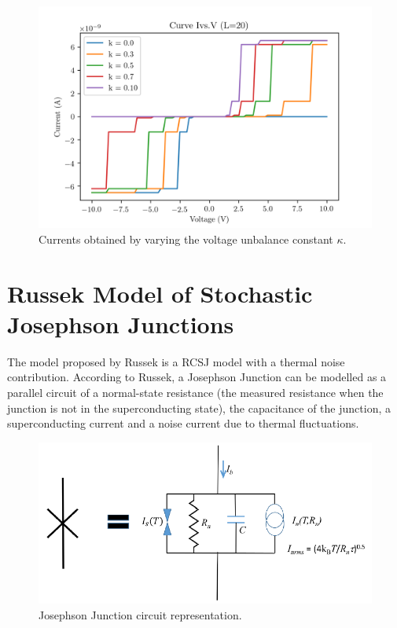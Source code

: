 \documentclass[12pt]{article}
\begin{document}
\begin{figure}[ht]
    \centering
    \includegraphics[scale=0.75]{Vark.png}
    \caption{Currents obtained by varying the voltage unbalance constant $\kappa$.}
    \label{fvark}
\end{figure}

\clearpage
\newpage
\section{Russek Model of Stochastic Josephson Junctions}

The model proposed by Russek\cite{RUSSEK} is a RCSJ model with a thermal noise contribution. According to Russek, a Josephson Junction can be modelled as a parallel circuit of a normal-state resistance (the measured resistance when the junction is not in the superconducting state), the capacitance of the junction, a superconducting current and a noise current due to thermal fluctuations. 
 
\begin{figure}[ht]
    \centering
    \includegraphics[scale=0.6]{Circuit.png}
    \caption{Josephson Junction circuit representation.}
    \label{CircuitJJ}
\end{figure}
\end{document}
